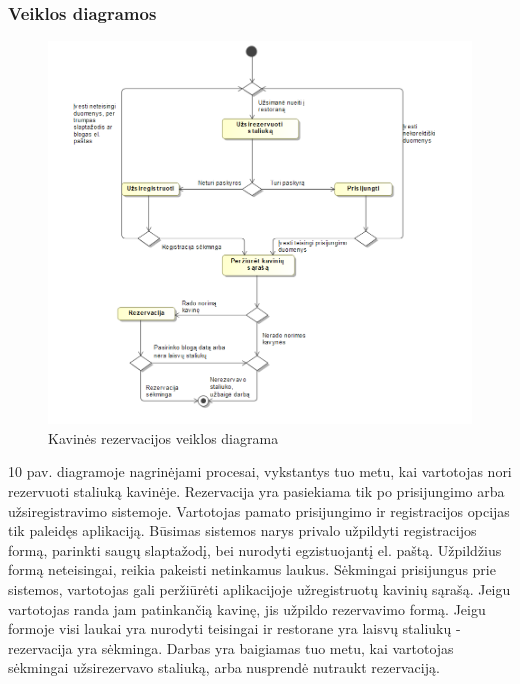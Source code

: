 \documentclass{VUMIFPSkursinis}
\begin{document}
\subsubsection{Veiklos diagramos}
\begin{figure}[H]
    \centering
    \includegraphics[width=\textwidth,height=\textheight,keepaspectratio]{img/rezerv} 
    \caption{Kavinės rezervacijos veiklos diagrama}
    \label{img:rezerv}
\end{figure}
10 pav.   diagramoje nagrinėjami procesai, vykstantys tuo metu, kai vartotojas nori rezervuoti staliuką kavinėje. Rezervacija yra pasiekiama tik po prisijungimo arba užsiregistravimo sistemoje. Vartotojas pamato prisijungimo ir registracijos opcijas tik paleidęs aplikaciją. Būsimas sistemos narys privalo užpildyti registracijos formą, parinkti saugų slaptažodį, bei nurodyti egzistuojantį el. paštą. Užpildžius formą neteisingai, reikia pakeisti netinkamus laukus. Sėkmingai prisijungus prie sistemos, vartotojas gali peržiūrėti aplikacijoje užregistruotų kavinių sąrašą. Jeigu vartotojas randa jam patinkančią kavinę, jis užpildo rezervavimo formą. Jeigu formoje visi laukai yra nurodyti teisingai ir restorane yra laisvų staliukų - rezervacija yra sėkminga. Darbas yra baigiamas tuo metu, kai vartotojas sėkmingai užsirezervavo staliuką, arba nusprendė nutraukt rezervaciją.
\end{document}
